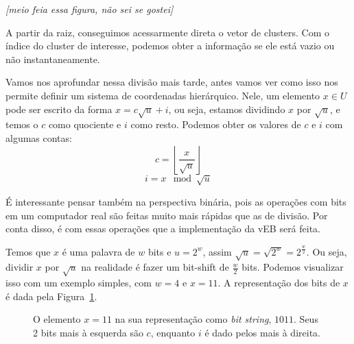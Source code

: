 \textit{[meio feia essa figura, não sei se gostei]}

A partir da raiz, conseguimos acessarmente direta o vetor de clusters. Com o
índice do cluster de interesse, podemos obter a informação se ele está vazio ou
não instantaneamente. 

Vamos nos aprofundar nessa divisão mais tarde, antes vamos ver como isso nos
permite definir um sistema de coordenadas hierárquico. Nele, um elemento $x \in
U$ pode ser escrito da forma $x=c\sqrt u + i$, ou seja, estamos dividindo $x$
por $\sqrt u$, e temos o $c$ como quociente e $i$ como resto. Podemos obter os
valores de $c$ e $i$ com algumas contas:
\[
c = \left \lfloor \frac{x}{\sqrt u} \right \rfloor 
\]
\[
i = x \mod \sqrt u
\]

É interessante pensar também na perspectiva binária, pois as operações com bits
em um computador real são feitas muito mais rápidas que as de divisão. Por conta
disso, é com essas operações que a implementação da vEB será feita. 

Temos que $x$ é uma palavra de $w$ bits e $u= 2^w$, assim $\sqrt u = \sqrt{2^w}
= 2^{\frac{w}{2}}$. Ou seja, dividir $x$ por $\sqrt u$ na realidade é fazer um
bit-shift de $\frac{w}{2}$ bits. Podemos visualizar isso com um exemplo simples,
com $w=4$ e $x=11$. A representação dos bits de $x$ é dada pela
Figura~\ref{f:veb-hierarch-coords}.

\begin{figure}[h]
\centering
{}
\caption{O elemento $x=11$ na sua representação como \textit{bit string},
$1011$. Seus 2 bits mais à esquerda são $c$, enquanto $i$ é dado pelos mais à
direita.\label{f:veb-hierarch-coords}}
\end{figure}

